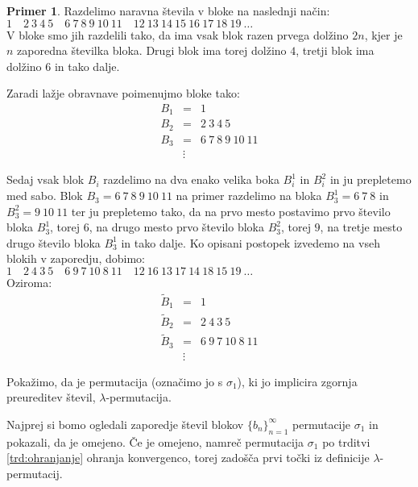 \documentclass[12pt,a4paper,reqno]{amsart}
\theoremstyle{definition} %
\newtheorem{primer}[definicija]{Primer}
\theoremstyle{plain} %
\begin{document}
\begin{primer}
Razdelimo naravna števila v bloke na naslednji način:\\

$1 \quad 2\: 3\: 4\: 5 \quad 6\: 7\: 8\: 9\: 10\: 11 \quad 12\: 13\: 14\: 15\: 16\: 17\: 18\: 19\: \ldots $\\

V bloke smo jih razdelili tako, da ima vsak blok razen prvega dolžino $2n$, kjer je $n$ zaporedna številka bloka. Drugi blok ima torej dolžino $4$, tretji blok ima dolžino $6$ in tako dalje.

Zaradi lažje obravnave poimenujmo bloke tako:
\begin{eqnarray*}
B_1&=& 1\\
B_2&=& 2\: 3\: 4\: 5\\
B_3&=& 6\: 7\: 8\: 9\: 10\: 11\\
&\vdots &
\end{eqnarray*}

Sedaj vsak blok $B_i$ razdelimo na dva enako velika boka $B_i^1$ in $B_i^2$ in ju prepletemo med sabo. Blok $B_3=6\: 7\: 8\: 9\: 10\: 11$ na primer razdelimo na bloka $B_3^1=6\: 7\: 8$ in $B_3^2=9\: 10\: 11$ ter ju prepletemo tako, da na prvo mesto postavimo prvo število bloka $B_3^1$, torej $6$, na drugo mesto prvo število bloka $B_3^2$, torej $9$, na tretje mesto drugo število bloka $B_3^1$ in tako dalje. Ko opisani postopek izvedemo na vseh blokih v zaporedju, dobimo:\\ 

$1 \quad 2\: 4\: 3\: 5 \quad 6\: 9\: 7\: 10\: 8\: 11 \quad 12\: 16\: 13\: 17\: 14\: 18\: 15\: 19\: \ldots $\\

Oziroma:
\begin{eqnarray*}
\tilde{B}_1&=& 1\\
\tilde{B}_2&=& 2\: 4\: 3\: 5\\
\tilde{B}_3&=& 6\: 9\: 7\: 10\: 8\: 11\\
&\vdots &
\end{eqnarray*}

Pokažimo, da je permutacija (označimo jo s $\sigma_1$), ki jo implicira zgornja preureditev števil, $\lambda$-permutacija.

Najprej si bomo ogledali zaporedje števil blokov $\{b_n\}_{n=1}^{\infty}$ permutacije $\sigma_1$ in pokazali, da je omejeno. Če je omejeno, namreč permutacija $\sigma_1$ po trditvi \ref{trd:ohranjanje} ohranja konvergenco, torej zadošča prvi točki iz definicije $\lambda$-permutacij. 


\end{primer}
\end{document}

